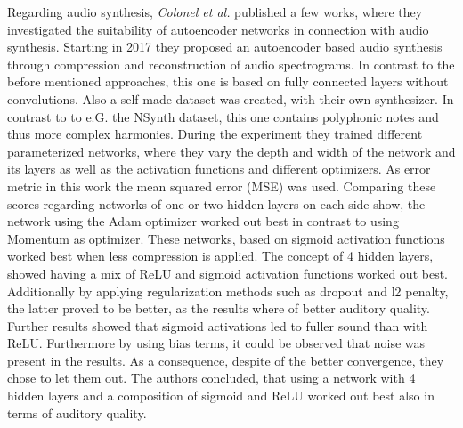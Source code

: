 Regarding audio synthesis, \textit{Colonel et al.} published a few works, where they investigated the suitability of autoencoder networks in connection with audio synthesis. \cite{colonel2017improving, colonel2018autoencoding, Colonel2020} Starting in 2017 they proposed an autoencoder based audio synthesis through compression and reconstruction of audio spectrograms. \cite{colonel2017improving} In contrast to the before mentioned approaches, this one is based on fully connected layers without convolutions. Also a self-made dataset was created, with their own synthesizer. In contrast to to e.G. the NSynth dataset, this one contains polyphonic notes and thus more complex harmonies. During the experiment they trained different parameterized networks, where they vary the depth and width of the network and its layers as well as the activation functions and different optimizers. As error metric in this work the mean squared error (MSE) was used. Comparing these scores regarding networks of one or two hidden layers on each side show, the network using the Adam optimizer worked out best in contrast to using Momentum as optimizer. These networks, based on sigmoid activation functions worked best when less compression is applied. The concept of 4 hidden layers, showed having a mix of ReLU and sigmoid activation functions worked out best. Additionally by applying regularization methods such as dropout and l2 penalty, the latter proved to be better, as the results where of better auditory quality. Further results showed that sigmoid activations led to fuller sound than with ReLU. Furthermore by using bias terms, it could be observed that noise was present in the results. As a consequence, despite of the better convergence, they chose to let them out. The authors concluded, that using a network with 4 hidden layers and a composition of sigmoid and ReLU worked out best also in terms of auditory quality.\\

